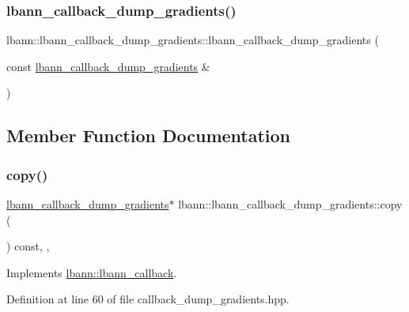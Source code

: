 \subsubsection{\texorpdfstring{lbann\+\_\+callback\+\_\+dump\+\_\+gradients()}{lbann\_callback\_dump\_gradients()}\hspace{0.1cm}{\footnotesize\ttfamily [2/2]}}
{\footnotesize\ttfamily lbann\+::lbann\+\_\+callback\+\_\+dump\+\_\+gradients\+::lbann\+\_\+callback\+\_\+dump\+\_\+gradients (\begin{DoxyParamCaption}\item[{const \hyperlink{classlbann_1_1lbann__callback__dump__gradients}{lbann\+\_\+callback\+\_\+dump\+\_\+gradients} \&}]{ }\end{DoxyParamCaption})\hspace{0.3cm}{\ttfamily [default]}}



\subsection{Member Function Documentation}
\mbox{\label{classlbann_1_1lbann__callback__dump__gradients_a16b659f1d7e313c02a840be5173ebb38}} 
\subsubsection{\texorpdfstring{copy()}{copy()}}
{\footnotesize\ttfamily \hyperlink{classlbann_1_1lbann__callback__dump__gradients}{lbann\+\_\+callback\+\_\+dump\+\_\+gradients}$\ast$ lbann\+::lbann\+\_\+callback\+\_\+dump\+\_\+gradients\+::copy (\begin{DoxyParamCaption}{ }\end{DoxyParamCaption}) const\hspace{0.3cm}{\ttfamily [inline]}, {\ttfamily [override]}, {\ttfamily [virtual]}}



Implements \hyperlink{classlbann_1_1lbann__callback_a9f545d1269a8c7af335625d049691f26}{lbann\+::lbann\+\_\+callback}.



Definition at line 60 of file callback\+\_\+dump\+\_\+gradients.\+hpp.


